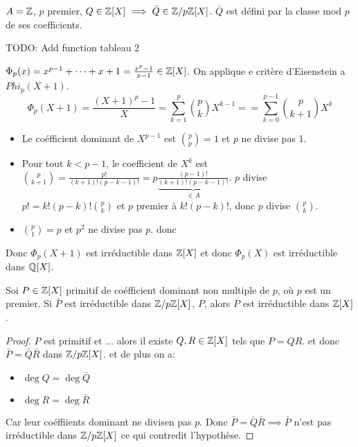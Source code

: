 \begin{example}
	$A = \mathbb{Z}$, $p$ premier,
	$Q \in \mathbb{Z}[X] \implies \bar{Q} \in \mathbb{Z}/p\mathbb{Z}[X]$.
	$\bar{Q}$ est défini par la classe mod $p$ de ses coefficients.

	TODO: Add function tableau 2
\end{example}


\begin{example}
	$\Phi_p(x) = x^{p-1} + \cdots + x + 1  = \frac{x^p - 1}{x-1} \in \mathbb{Z}[X]$.
	On applique e critère d'Eisenstein a $Phi_p(X+1)$.
	$$ \Phi_p(X+1) = \frac{(X+1)^p - 1}{X} = \sum_{k=1}^p \binom{p}{k} X^{k-1} == \sum_{k=0}^{p-1} \binom{p}{k+1} X^k$$
	\begin{itemize}
		\item Le coéfficient dominant de $X^{p-1}$ est $\binom{p}{p} = 1$ et $p$ ne divise pas 1.
		\item Pour tout $k < p-1$, le coefficient de $X^k$ est $\binom{p}{k+1} = \frac{p!}{(k+1)!(p-k-1)!} = p \underbrace{\frac{(p-1)!}{(k+1)!(p-k-1)!}}_{\in A}$.
		      $p$ divise $p! = k!(p-k)!\binom{p}{k}$ et $p$ premier à $k!(p-k)!$, donc $p$ divise $\binom{p}{k}$.
		\item $\binom{p}{1} = p$ et $p^2$ ne divise pas $p$. donc
	\end{itemize}
	Donc $\Phi_p(X+1)$ est irréductible dans $\mathbb{Z}[X]$ et donc $\Phi_p(X)$ est irréductible dans $\mathbb{Q}[X]$.
\end{example}


\begin{prop}
	Soi $P \in \mathbb{Z}[X]$ primitif de coéfficient dominant non multiple de $p$, où $p$ est un premier.
	Si $\bar{P}$ est irréductible dans  $\mathbb{Z}/p\mathbb{Z}[X]$, $P$, alors $P$ est irréductible dans $\mathbb{Z}[X]$.
\end{prop}

\begin{proof}
	$P$ est primitif et ... alors il existe $Q, R \in \mathbb{Z}[X]$ tels que $P = QR$.
	et donc $\bar{P} = \bar{Q}\bar{R}$ dans $\mathbb{Z}/p\mathbb{Z}[X]$.
	et de plus on a:
	\begin{itemize}
		\item $\deg Q = \deg \bar{Q}$
		\item $\deg R = \deg \bar{R}$

	\end{itemize}
	Car leur coéffiients dominant ne divisen pas $p$.
	Donc $\bar{P} = \bar{Q}\bar{R} \implies \bar{P}$ n'est pas irréductible dans $\mathbb{Z}/p\mathbb{Z}[X]$ ce qui contredit l'hypothèse.
\end{proof}
